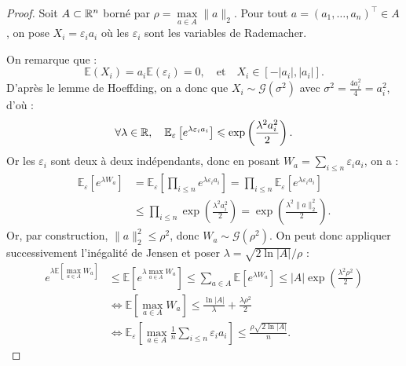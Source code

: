 \begin{proof}
    Soit $ A \subset \mathbb{R}^n$ borné par $ \rho = \underset{a \in A}{\max} \|a\|_2$. Pour tout $a = (a_1, \dots, a_n)^\top \in A$, on pose $ X_i = \varepsilon_i a_i$ où les $ \varepsilon_i$ sont les variables de Rademacher. 

    On remarque que : 
    \begin{equation}
        \mathbb{E}(X_i) = a_i \mathbb{E}( \varepsilon_i) = 0, \quad \text{et} \quad X_i \in [- |a_i|, |a_i|]. 
    \end{equation}
    D'après le lemme de Hoeffding, on a donc que $ X_i \sim \mathcal{G}( \sigma^2)$ avec $ \sigma^2 = \frac{4 a_i^2}{4} = a_i^2$, d'où :
    \begin{equation}
        \forall \lambda \in \mathbb{R}, \quad \mathbb{E}_{ \varepsilon} \left[ e^{ \lambda \varepsilon_i a_i}\right] \leqslant \exp \left( \frac{ \lambda^2 a_i^2}{2}\right). 
    \end{equation}
    Or les $ \varepsilon_i$ sont deux à deux indépendants, donc en posant $W_a = \sum_{i \leqslant n} \varepsilon_i a_i$, on a : 
    \begin{align*}
        \mathbb{E}_{ \varepsilon} \left[ e^{ \lambda W_a}\right] &= \mathbb{E}_\varepsilon \left[ \prod_{i \leqslant n} e^{ \lambda \varepsilon_i a_i}\right] 
        = \prod_{i \leqslant n} \mathbb{E}_\varepsilon \left[ e^{ \lambda \varepsilon_i a_i}\right] \\ 
        &\leqslant \prod_{i \leqslant n} \exp \left( \frac{ \lambda^2 a_i^2}{2}\right) = \exp \left( \frac{ \lambda^2 \|a\|_2^2}{2}\right). 
    \end{align*}
    Or, par construction, $ \|a\|_2^2 \leqslant \rho^2$, donc $ W_a \sim \mathcal{G}( \rho^2)$. On peut donc appliquer successivement l'inégalité de Jensen et poser $ \lambda = \sqrt{2 \ln|A|} / \rho$ : 
    \begin{align*}
        e^{ \lambda \mathbb{E} [ \max_{a \in A} W_a]} &\leqslant \mathbb{E} \left[e^{ \lambda \max_{a \in A} W_a}\right] \leqslant \sum_{a \in A} \mathbb{E} \left[ e^{ \lambda W_a}\right] \leqslant |A| \exp \left( \frac{ \lambda^2 \rho^2}{2}\right) \\ 
        &\iff \mathbb{E} \left[ \max_{a \in A} W_a\right] \leqslant \frac{\ln|A|}{ \lambda} + \frac{ \lambda \rho^2}{2} \\ 
        &\iff \mathbb{E}_{ \varepsilon} \left[ \max_{a \in A} \frac{1}{n} \sum_{ i \leqslant n} \varepsilon_i a_i\right] \leqslant \frac{ \rho \sqrt{2 \ln|A|}}{n}. 
    \end{align*}
\end{proof}

